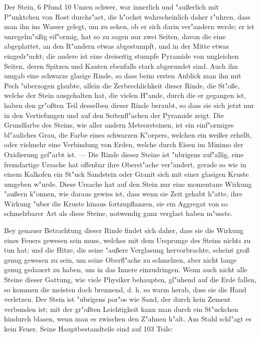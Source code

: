 \documentclass[a4paper, 11pt, oneside, polutonikogreek, german]{article}
\begin{document}
Der Stein, 6 Pfund 10 Unzen schwer, war innerlich und "außerlich mit P"unktchen von Rost durchs"aet, die h"ochst wahrscheinlich daher r"uhren, dass man ihn ins Wasser gelegt, um zu sehen, ob er sich darin ver"andern werde; er ist unregelm"aßig eif"ormig, hat so zu sagen nur zwei Seiten, davon die eine abgeplattet, an den R"andern etwas abgestumpft, und in der Mitte etwas eingedr"uckt; die andere ist eine dreiseitig stumpfe Pyramide von ungleichen Seiten, deren Spitzen und Kanten ebenfalls stark abgerundet sind. Auch ihn umgab eine schwarze glasige Rinde, so dass beim ersten Anblick man ihn mit Pech "uberzogen glaubte, allein die Zerbrechlichkeit dieser Rinde, die St"oße, welche der Stein ausgehalten hat, die vielen H"ande, durch die er gegangen ist, haben den gr"oßten Teil desselben dieser Rinde beraubt, so dass sie sich jetzt nur in den Vertiefungen und auf den Seitenfl"achen der Pyramide zeigt. Die Grundfarbe des Steins, wie aller andern Meteorsteinen, ist ein einf"ormiges bl"auliches Grau, die Farbe eines schwarzen K"orpers, welchen ein weißer erhellt, oder vielmehr eine Verbindung von Erden, welche durch Eisen im Minimo der Oxidierung gef"arbt ist. --- Die Rinde dieser Steine ist "ubrigens zuf"allig, eine fremdartige Ursache hat offenbar ihre Oberst"ache ver"andert, gerade so wie in einem Kalkofen ein St"uck Sandstein oder Granit sich mit einer glasigen Kruste umgeben w"urde. Diese Ursache hat auf den Stein nur eine momentane Wirkung "außern k"onnen, wie daraus gewiss ist, dass wenn sie Zeit gehabt h"atte, ihre Wirkung "uber die Kruste hinaus fortzupflanzen, sie ein Aggregat von so schmelzbarer Art als diese Steine, notwendig ganz verglast haben m"usste.

Bey genauer Betrachtung dieser Rinde findet sich daher, dass sie die Wirkung eines Feuers gewesen sein muss, welches mit dem Ursprunge des Steins nichts zu tun hat; und die Hitze, die seine "außere Verglasung hervorbrachte, scheint groß genug gewesen zu sein, um seine Oberfl"ache zu schmelzen, aber nicht lange genug gedauert zu haben, um in das Innere einzudringen. Wenn auch nicht alle Steine dieser Gattung, wie viele Physiker behaupten, gl"uhend auf die Erde fallen, so kommen die meisten doch brennend, d. h. so warm herab, dass sie die Hand verletzen. Der Stein ist "ubrigens por"os wie Sand, der durch kein Zement verbunden ist; mit der gr"oßten Leichtigkeit kann man durch ein St"uckchen hindurch blasen, wenn man es zwischen den Z"ahnen h"alt. Am Stahl schl"agt es kein Feuer. Seine Hauptbestandteile sind auf 103 Teile:
\end{document}
